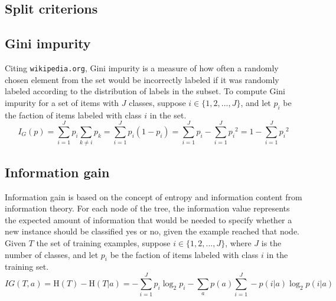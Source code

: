 \documentclass[11pt, a4paper]{article}
\begin{document}
\begin{appendix}
  \section{Split criterions}
    \label{appendix:splitcriterions}
    \subsection{Gini impurity}
      Citing \texttt{wikipedia.org}, Gini impurity is a measure of how often a randomly chosen element from the set would be incorrectly labeled if it was randomly labeled according to the distribution of labels in the subset. To compute Gini impurity for a set of items with $J$ classes, suppose $i\in\{1,2,...,J\}$, and let $p_{i}$ be the faction of items labeled with class $i$ in the set.
      \[{I} _{G}(p)=\sum _{i=1}^{J}p_{i}\sum _{k\neq i}p_{k}=\sum _{i=1}^{J}p_{i}(1-p_{i})=\sum _{i=1}^{J}p_{i}-\sum _{i=1}^{J}{p_{i}}^{2}=1-\sum _{i=1}^{J}{p_{i}}^{2}\]
    \subsection{Information gain}
      Information gain is based on the concept of entropy and information content from information theory. For each node of the tree, the information value represents the expected amount of information that would be needed to specify whether a new instance should be classified yes or no, given the example reached that node. Given $T$ the set of training examples, suppose $i\in\{1,2,...,J\}$, where $J$ is the number of classes, and let $p_{i}$ be the faction of items labeled with class $i$ in the training set.
      \[IG(T, a)=\mathrm{H}(T)-\mathrm{H}(T|a)=-\sum _{i=1}^{J}p_{i}\log _{2}{p_{i}}-\sum _{a}{p(a)\sum _{i=1}^{J}-p(i|a)\log _{2}{p(i|a)}}\]


\end{appendix}
\end{document}
